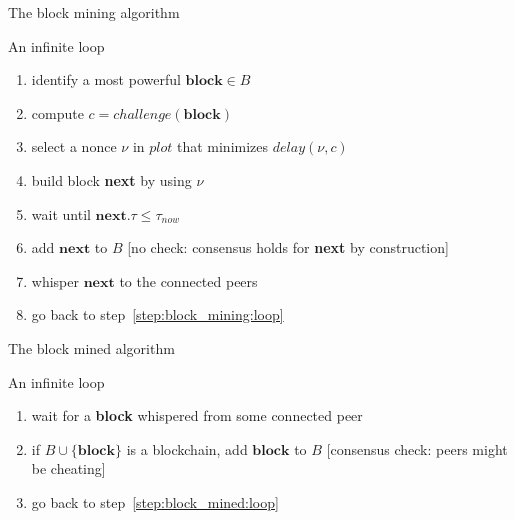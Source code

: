\documentclass[11pt]{beamer}  %
\newcommand{\plot}{{\mathit{plot}}}
\newcommand{\challenge}{{\mathit{challenge}}}
\newcommand{\delay}{{\mathit{delay}}}
\newcommand{\now}{{\mathit{now}}}
\begin{document}
\addtocounter{framenumber}{-1}

\begin{frame}{The block mining algorithm}

  \begin{greenbox}{An infinite loop}
    \begin{enumerate}[<+->]
    \item\label{step:block_mining:loop} identify a most powerful $\mathbf{block}\in B$
    \item\label{step:block_mining:next_challenge} compute $c=\challenge(\mathbf{block})$
    \item\label{step:block_mining:next_deadline} select a nonce $\nu$ in $\plot$ that minimizes $\delay(\nu,c)$
    \item\label{step:block_mining:next_block} build block \textbf{next} by using $\nu$
    \item\label{step:block_mining:wait} wait until $\mathbf{next}.\tau\le\tau_\now$
    \item\label{step:block_mining:add} add $\mathbf{next}$ to $B$ [no check: consensus holds for \textbf{next} by construction]
    \item\label{step:block_mining:whisper} whisper $\mathbf{next}$ to the connected peers
    \item go back to step~\ref{step:block_mining:loop}
    \end{enumerate}
  \end{greenbox}

\end{frame}

\addtocounter{framenumber}{-1}

\begin{frame}{The block mined algorithm}

  \begin{greenbox}{An infinite loop}
    \begin{enumerate}[<+->]
    \item\label{step:block_mined:loop} wait for a \textbf{block} whispered from some connected peer
    \item\label{step:block_mined:add} if $B\cup\{\mathbf{block}\}$ is a blockchain, add $\mathbf{block}$ to $B$ [consensus check: peers might be cheating]
    \item go back to step~\ref{step:block_mined:loop}
    \end{enumerate}
  \end{greenbox}

\end{frame}
\end{document}
